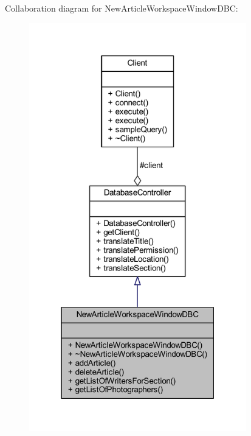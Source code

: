 Collaboration diagram for New\+Article\+Workspace\+Window\+D\+B\+C\+:
\nopagebreak
\begin{figure}[H]
\begin{center}
\leavevmode
\includegraphics[width=268pt]{class_new_article_workspace_window_d_b_c__coll__graph}
\end{center}
\end{figure}
